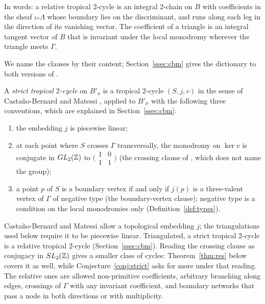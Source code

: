In words: a relative tropical $2$-cycle is an integral $2$-chain on $B$ with coefficients in the sheaf $\iota_*\Lambda$
whose boundary lies on the discriminant, and runs along each leg in the direction of its vanishing vector. The
coefficient of a triangle is an integral tangent vector of $B$ that is invariant under the local monodromy wherever the
triangle meets $\Gamma$.

We name the clauses by their content; Section~\ref{ssec:cbm} gives the dictionary to both versions of \cite{CBM}.

\begin{definition}\label{def:strict}
A \emph{strict tropical $2$-cycle} on $B'_\sigma$ is a tropical $2$-cycle $(S,j,v)$ in the sense of Casta\~no-Bernard and
Matessi \cite[Def.~7.2]{CBM}, applied to $B'_\sigma$ with the following three conventions, which are explained in
Section~\ref{ssec:cbm}:
\begin{enumerate}
\item the embedding $j$ is piecewise linear;
\item at each point where $S$ crosses $\Gamma$ transversally, the monodromy on $\ker v$ is conjugate in $GL_2(\mathbb Z)$ to
$\bigl(\begin{smallmatrix}1&0\\1&1\end{smallmatrix}\bigr)$ (the crossing clause of \cite[Def.~7.2]{CBM}, which does not name the
group);
\item a point $p$ of $S$ is a boundary vertex if and only if $j(p)$ is a three-valent vertex of $\Gamma$ of negative type
(the boundary-vertex clause); negative type is a condition on the local monodromies only (Definition~\ref{def:types}).
\end{enumerate}
\end{definition}

Casta\~no-Bernard and Matessi allow a topological embedding $j$; the triangulations used below require it to be piecewise
linear. Triangulated, a strict tropical $2$-cycle is a relative tropical $2$-cycle (Section~\ref{ssec:cbm}). Reading
the crossing clause as conjugacy in $SL_2(\mathbb Z)$ gives a smaller class of cycles: Theorem~\ref{thm:res} below covers it as well, while
Conjecture~\ref{conj:strict} asks for more under that reading.
The relative ones are allowed non-primitive coefficients, arbitrary
branching along edges, crossings of $\Gamma$ with any invariant coefficient, and boundary networks that pass a node in both
directions or with multiplicity.

